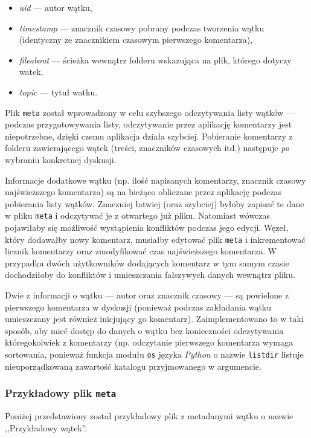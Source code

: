 \documentclass[polish,a4paper,twoside]{ppfcmthesis}
\begin{document}
\begin{itemize}[noitemsep]
  \item \emph{uid} --- autor wątku,
  \item \emph{timestamp} --- znacznik czasowy pobrany podczas tworzenia wątku (identyczny ze znacznikiem czasowym pierwszego komentarza),
  \item \emph{fileabout} --- ścieżka wewnątrz folderu wskazująca na plik, którego dotyczy watek,
  \item \emph{topic} --- tytuł watku.
\end{itemize}

Plik \texttt{meta} został wprowadzony w celu szybszego odczytywania listy wątków --- podczas przygotowywania listy, odczytywanie przez aplikację komentarzy jest niepotrzebne, dzięki czemu aplikacja działa szybciej. Pobieranie komentarzy z folderu zawierającego wątek (treści, znaczników czasowych itd.) następuje \emph{po} wybraniu konkretnej dyskusji.

Informacje dodatkowe wątku (np. ilość napisanych komentarzy, znacznik czasowy najświeższego komentarza) są na bieżąco obliczane przez aplikację podczas pobierania listy wątków. Znaczniej łatwiej (oraz szybciej) byłoby zapisać te dane w pliku \texttt{meta} i odczytywać je z otwartego już pliku. Natomiast wówczas pojawiłaby się możliwość wystąpienia konfliktów podczas jego edycji. Węzeł, który dodawałby nowy komentarz, musiałby edytować plik \texttt{meta} i inkrementować licznik komentarzy oraz zmodyfikować czas najświeższego komentarza. W przypadku dwóch użytkowników dodających komentarz w tym samym czasie dochodziłoby do konfliktów i umieszczania fałszywych danych wewnątrz pliku.

Dwie z informacji o wątku --- autor oraz znacznik czasowy --- są powielone z pierwszego komentarza w dyskusji (ponieważ podczas zakładania wątku umieszczany jest również inicjujący go komentarz). Zaimplementowano to w taki sposób, aby mieć dostęp do danych o wątku bez konieczności odczytywania któregokolwiek z komentarzy (np. odczytanie pierwszego komentarza wymaga sortowania, ponieważ funkcja modułu \texttt{os} języka \emph{Python} o nazwie \texttt{listdir} listuje nieuporządkowaną zawartość katalogu przyjmowanego w argumencie.

\subsubsection*{Przykładowy plik \texttt{meta}}

Poniżej przedstawiony został przykładowy plik z metadanymi wątku o nazwie ,,Przykładowy wątek''.
\end{document}
